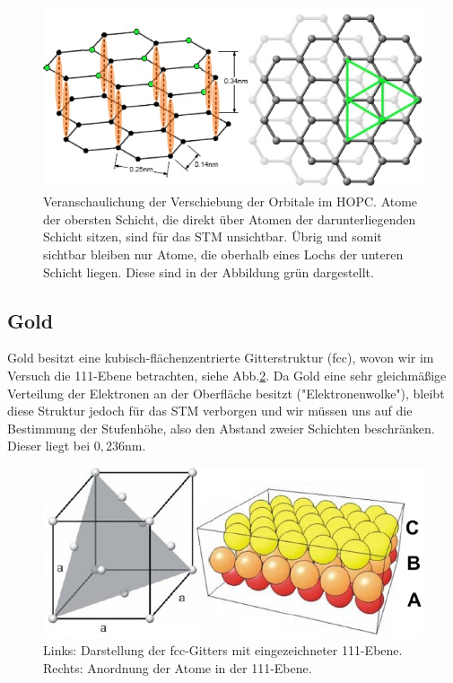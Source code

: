 \begin{figure}[h]
	\centering
	\includegraphics[width=\linewidth]{Mess/HOPC.png}
        \caption{Veranschaulichung der Verschiebung der Orbitale im HOPC. Atome der obersten Schicht, die direkt über Atomen der darunterliegenden Schicht sitzen, sind für das STM unsichtbar. Übrig und somit sichtbar bleiben nur Atome, die oberhalb eines Lochs der unteren Schicht liegen. Diese sind in der Abbildung grün dargestellt. \cite{beschr}}
	\label{hopc}
\end{figure}

\subsection{Gold}
Gold besitzt eine kubisch-flächenzentrierte Gitterstruktur (fcc), wovon wir im Versuch die 111-Ebene betrachten, siehe Abb.\ref{gold_struktur}. Da Gold eine sehr gleichmäßige Verteilung der Elektronen an der Oberfläche besitzt ("{}Elektronenwolke"), bleibt diese Struktur jedoch für das STM verborgen und wir müssen uns auf die Bestimmung der Stufenhöhe, also den Abstand zweier Schichten beschränken. Dieser liegt bei $0,236\si{\nano\meter}$.

\begin{figure}[h]
	\centering
	\includegraphics[width=\linewidth]{Mess/gold_struktur.png}
        \caption{Links: Darstellung der fcc-Gitters mit eingezeichneter 111-Ebene. Rechts: Anordnung der Atome in der 111-Ebene. \cite{beschr}}
	\label{gold_struktur}
\end{figure}

